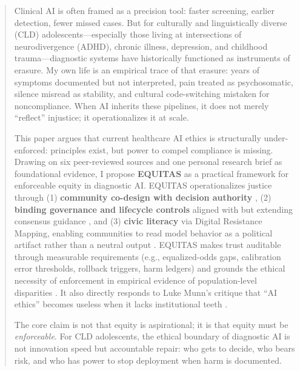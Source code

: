 \clearpage

\begin{abstract}
\noindent
Clinical AI is often framed as a precision tool: faster screening, earlier detection, fewer missed cases. But for culturally and linguistically diverse (CLD) adolescents—especially those living at intersections of neurodivergence (ADHD), chronic illness, depression, and childhood trauma—diagnostic systems have historically functioned as instruments of erasure. My own life is an empirical trace of that erasure: years of symptoms documented but not interpreted, pain treated as psychosomatic, silence misread as stability, and cultural code-switching mistaken for noncompliance. When AI inherits these pipelines, it does not merely ``reflect'' injustice; it operationalizes it at scale.

\vspace{0.4em}
This paper argues that current healthcare AI ethics is structurally under-enforced: principles exist, but power to compel compliance is missing. Drawing on six peer-reviewed sources and one personal research brief as foundational evidence, I propose \textbf{EQUITAS} as a practical framework for enforceable equity in diagnostic AI. EQUITAS operationalizes justice through (1) \textbf{community co-design with decision authority} \citep{Nadarzynski2024}, (2) \textbf{binding governance and lifecycle controls} aligned with but extending consensus guidance \citep{Lekadir2025}, and (3) \textbf{civic literacy} via Digital Resistance Mapping, enabling communities to read model behavior as a political artifact rather than a neutral output \citep{GarciaBautista2025RMP}. EQUITAS makes trust auditable through measurable requirements (e.g., equalized-odds gaps, calibration error thresholds, rollback triggers, harm ledgers) \citep{Sagona2025, Chen2023} and grounds the ethical necessity of enforcement in empirical evidence of population-level disparities \citep{Marko2025}. It also directly responds to Luke Munn’s critique that ``AI ethics'' becomes useless when it lacks institutional teeth \citep{Munn2023}.

\vspace{0.4em}
The core claim is not that equity is aspirational; it is that equity must be \emph{enforceable}. For CLD adolescents, the ethical boundary of diagnostic AI is not innovation speed but accountable repair: who gets to decide, who bears risk, and who has power to stop deployment when harm is documented.

\vfill
{}
\end{abstract}

